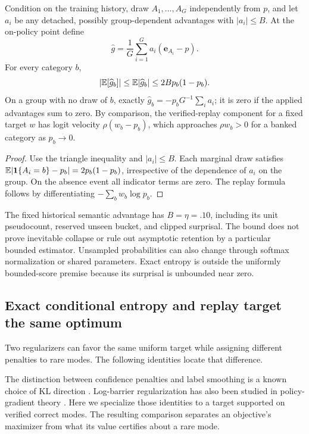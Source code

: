 \begin{lemma}
\label{lem:sampled-score-bound}
Condition on the training history, draw $A_1,\ldots,A_G$ independently from
$p$, and let $a_i$ be any detached, possibly group-dependent advantages with
$|a_i|\le B$. At the on-policy point define
\[
 \widehat g=\frac1G\sum_{i=1}^G a_i(\mathbf e_{A_i}-p).
\]
For every category $b$,
\[
 |\mathbb E[\widehat g_b]|\le\mathbb E|\widehat g_b|
 \le 2B p_b(1-p_b).
\]
On a group with no draw of $b$, exactly
$\widehat g_b=-p_bG^{-1}\sum_i a_i$; it is zero if the applied advantages
sum to zero. By comparison, the verified-replay component for a fixed target
$w$ has logit velocity $\rho(w_b-p_b)$, which approaches $\rho w_b>0$
for a banked category as $p_b\to0$.
\end{lemma}

\begin{proof}
Use the triangle inequality and $|a_i|\le B$. Each marginal draw satisfies
$\mathbb E|\mathbf 1\{A_i=b\}-p_b|=2p_b(1-p_b)$, irrespective of the dependence of
$a_i$ on the group. On the absence event all indicator terms are zero.
The replay formula follows by differentiating $-\sum_b w_b\log p_b$.
\end{proof}

The fixed historical semantic advantage has $B=\eta=.10$, including its
unit pseudocount, reserved unseen bucket, and clipped surprisal. The bound
does not prove inevitable collapse or rule out asymptotic retention by a
particular bounded estimator. Unsampled probabilities can also change through
softmax normalization or shared parameters. Exact entropy is outside the
uniformly bounded-score premise because its surprisal is unbounded near zero.

\subsection{Exact conditional entropy and replay target the same optimum}
\label{app:theory-entropy-comparison}

Two regularizers can favor the same uniform target while assigning different
penalties to rare modes. The following identities locate that difference.


The distinction between confidence penalties and label smoothing is a known
choice of KL direction \citep[Section~3.2]{pereyra2017confidencepenalty}.
Log-barrier regularization has also been studied in policy-gradient theory
\citep[Section~5.2]{agarwal2021policygradient}. Here we specialize those
identities to a target supported on verified correct modes. The resulting
comparison separates an objective's maximizer from what its value certifies
about a rare mode.

